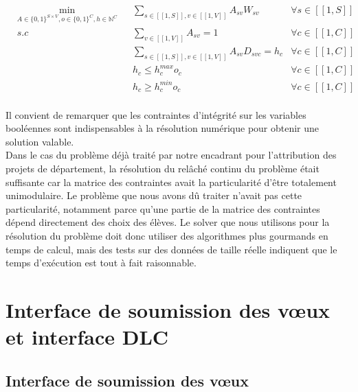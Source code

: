\documentclass[12pt]{article}
\begin{document}
\begin{align*}
   &\min \limits_{A \in \{ 0,1\} ^{S \times V}, o \in\{ 0,1\} ^{C}, h \in \mathbb{N}^C} & & \sum \limits_{s \in [\![1, S]\!], v \in [\![1, V]\!]} A_{sv}W_{sv}         & \forall s \in[\![1, S]\!]\\
   &s.c                                                                                 & & \sum \limits_{v \in [\![1, V]\!]}  A_ {sv} = 1                             & \forall c \in[\![1, C]\!]\\
   &                                                                                    & & \sum \limits_{s \in [\![1, S]\!], v \in [\![1, V]\!]} A_{sv}D_{svc} = h_c  & \forall c \in[\![1, C]\!]\\
   &                                                                                    & & h_c  \leq h_c^{max}o_c                                                     & \forall c \in[\![1, C]\!]\\
   &                                                                                    & & h_c  \geq h_c^{min}o_c                                                     & \forall c \in[\![1, C]\!]\\
\end{align*}


Il convient de remarquer que les contraintes d’intégrité sur les variables booléennes sont indispensables à la résolution numérique pour obtenir une solution valable. \\ 

Dans le cas du problème déjà traité par notre encadrant pour l’attribution des projets de département, la résolution du relâché continu du problème était suffisante car la matrice des contraintes avait la particularité d’être totalement unimodulaire. Le problème que nous avons dû traiter n’avait pas cette particularité, notamment parce qu’une partie de la matrice des contraintes dépend directement des choix des élèves. Le solver que nous utilisons pour la résolution du problème doit donc utiliser des algorithmes plus gourmands en temps de calcul, mais des tests sur des données de taille réelle indiquent que le temps d’exécution est tout à fait raisonnable. \\

	
  \section{Interface de soumission des vœux et interface DLC }
    \subsection{Interface de soumission des vœux}
\end{document}
